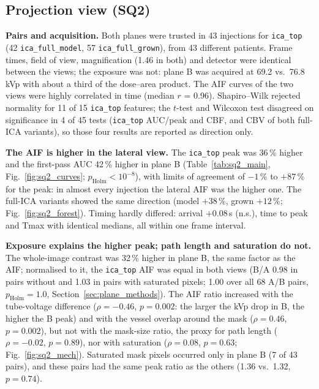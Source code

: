 \subsection{Projection view (SQ2)}
\label{sec:sq2_results}

\textbf{Pairs and acquisition.} Both planes were trusted in 43 injections for \texttt{ica\_top} (42
\texttt{ica\_full\_model}, 57 \texttt{ica\_full\_grown}), from 43 different patients. Frame times, field of view,
magnification (1.46 in both) and detector were identical between the views; the exposure was not: plane B was
acquired at 69.2 vs.\ 76.8\,kVp with about a third of the dose--area product. The AIF curves of the two views were
highly correlated in time (median $r$ = 0.96). Shapiro--Wilk rejected normality for 11 of 15 \texttt{ica\_top}
features; the $t$-test and Wilcoxon test disagreed on significance in 4 of 45 tests (\texttt{ica\_top} AUC/peak
and CBF, and CBV of both full-ICA variants), so those four results are reported as direction only.

\textbf{The AIF is higher in the lateral view.} The \texttt{ica\_top} peak was 36\,\% higher and the first-pass AUC
42\,\% higher in plane B (Table~\ref{tab:sq2_main}, Fig.~\ref{fig:sq2_curves}; $p_\mathrm{Holm} < 10^{-8}$), with
limits of agreement of $-1$\,\% to $+87$\,\% for the peak: in almost every injection the lateral AIF was the higher
one. The full-ICA variants showed the same direction (model $+38$\,\%, grown $+12$\,\%; Fig.~\ref{fig:sq2_forest}).
Timing hardly differed: arrival $+0.08$\,s (n.s.), time to peak and Tmax with identical medians, all within one
frame interval.

\textbf{Exposure explains the higher peak; path length and saturation do not.} The whole-image contrast was 32\,\%
higher in plane B, the same factor as the AIF; normalised to it, the \texttt{ica\_top} AIF was equal in both views
(B/A 0.98 in pairs without and 1.03 in pairs with saturated pixels; 1.00 over all 68 A/B pairs, $p_\mathrm{Holm} =
1.0$, Section~\ref{sec:plane_methods}). The AIF ratio increased with the tube-voltage difference ($\rho = -0.46$,
$p = 0.002$: the larger the kVp drop in B, the higher the B peak) and with the vessel overlap around the mask
($\rho = 0.46$, $p = 0.002$), but not with the mask-size ratio, the proxy for path length ($\rho = -0.02$, $p =
0.89$), nor with saturation ($\rho = 0.08$, $p = 0.63$; Fig.~\ref{fig:sq2_mech}). Saturated mask pixels occurred
only in plane B (7 of 43 pairs), and these pairs had the same peak ratio as the others (1.36 vs.\ 1.32, $p =
0.74$).

